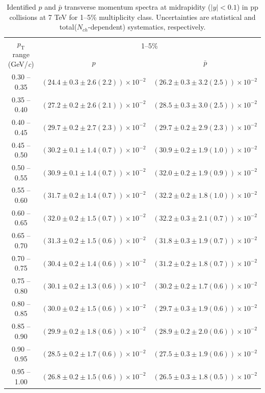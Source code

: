 \begin{table}
\caption{Identified $p$ and $\bar{p}$  transverse momentum spectra at midrapidity ($|y|<0.1$) in pp collisions at 7 TeV for 1--5\% multiplicity class. Uncertainties are statistical and total($N_{ch}$-dependent) systematics, respectively.}
\label{tab:ProtonPlus_ProtonMinus_1to5}
\begin{center}
\begin{tabular}{ c | c c }
\hline
\multirow{2}{*}{$p_{\mathrm{T}}$ range (GeV/\textit{c})} & \multicolumn{2}{c}{1--5\%} \\ & $p$& $\bar{p}$\\ 
\hline
0.30 -- 0.35 & $(24.4\pm0.3\pm2.6(2.2))\times10^{-2}$ & $(26.2\pm0.3\pm3.2(2.5))\times10^{-2}$ \\ 
0.35 -- 0.40 & $(27.2\pm0.2\pm2.6(2.1))\times10^{-2}$ & $(28.5\pm0.3\pm3.0(2.5))\times10^{-2}$ \\ 
0.40 -- 0.45 & $(29.7\pm0.2\pm2.7(2.3))\times10^{-2}$ & $(29.7\pm0.2\pm2.9(2.3))\times10^{-2}$ \\ 
0.45 -- 0.50 & $(30.2\pm0.1\pm1.4(0.7))\times10^{-2}$ & $(30.9\pm0.2\pm1.9(1.0))\times10^{-2}$ \\ 
0.50 -- 0.55 & $(30.9\pm0.1\pm1.4(0.7))\times10^{-2}$ & $(32.0\pm0.2\pm1.9(0.9))\times10^{-2}$ \\ 
0.55 -- 0.60 & $(31.7\pm0.2\pm1.4(0.7))\times10^{-2}$ & $(32.2\pm0.2\pm1.8(1.0))\times10^{-2}$ \\ 
0.60 -- 0.65 & $(32.0\pm0.2\pm1.5(0.7))\times10^{-2}$ & $(32.2\pm0.3\pm2.1(0.7))\times10^{-2}$ \\ 
0.65 -- 0.70 & $(31.3\pm0.2\pm1.5(0.6))\times10^{-2}$ & $(31.8\pm0.3\pm1.9(0.7))\times10^{-2}$ \\ 
0.70 -- 0.75 & $(30.4\pm0.2\pm1.4(0.6))\times10^{-2}$ & $(31.2\pm0.2\pm1.8(0.7))\times10^{-2}$ \\ 
0.75 -- 0.80 & $(30.1\pm0.2\pm1.3(0.6))\times10^{-2}$ & $(30.2\pm0.2\pm1.7(0.6))\times10^{-2}$ \\ 
0.80 -- 0.85 & $(30.0\pm0.2\pm1.5(0.6))\times10^{-2}$ & $(29.7\pm0.3\pm1.9(0.6))\times10^{-2}$ \\ 
0.85 -- 0.90 & $(29.9\pm0.2\pm1.8(0.6))\times10^{-2}$ & $(28.9\pm0.2\pm2.0(0.6))\times10^{-2}$ \\ 
0.90 -- 0.95 & $(28.5\pm0.2\pm1.7(0.6))\times10^{-2}$ & $(27.5\pm0.3\pm1.9(0.6))\times10^{-2}$ \\ 
0.95 -- 1.00 & $(26.8\pm0.2\pm1.5(0.6))\times10^{-2}$ & $(26.5\pm0.3\pm1.8(0.5))\times10^{-2}$ \\ 

\end{tabular}
\end{center}
\end{table}
